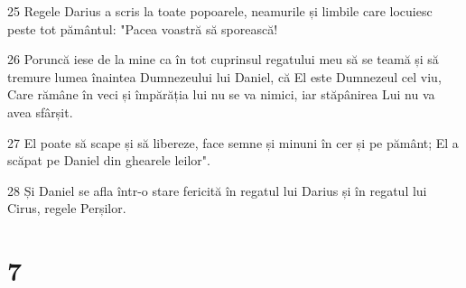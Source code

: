 \par 25 Regele Darius a scris la toate popoarele, neamurile și limbile care locuiesc peste tot pământul: "Pacea voastră să sporească!
\par 26 Poruncă iese de la mine ca în tot cuprinsul regatului meu să se teamă și să tremure lumea înaintea Dumnezeului lui Daniel, că El este Dumnezeul cel viu, Care rămâne în veci și împărăția lui nu se va nimici, iar stăpânirea Lui nu va avea sfârșit.
\par 27 El poate să scape și să libereze, face semne și minuni în cer și pe pământ; El a scăpat pe Daniel din ghearele leilor".
\par 28 Și Daniel se afla într-o stare fericită în regatul lui Darius și în regatul lui Cirus, regele Perșilor.

\chapter{7}

